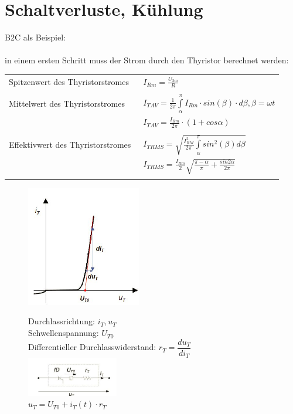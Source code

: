 	\section{Schaltverluste, Kühlung}
B2C als Beispiel:\\\\
in einem ersten Schritt muss der Strom durch den Thyristor berechnet werden:\\
\begin{tabular}{ll}
  Spitzenwert des Thyristorstromes&\ $I_{Rm} = \frac{U_{2m}}{R}$\\\\
  Mittelwert des Thyristorstromes &\ $I_{T AV} = \frac{1}{2\pi}\int\limits_{\alpha}^{\pi}I_{Rm} \cdot sin(\beta) \cdot d\beta, \beta = \omega t$\\
  &\ $I_{T AV} = \frac{I_{Rm}}{2\pi} \cdot (1+cos\alpha)$\\\\
  Effektivwert des Thyristorstromes &\ $I_{T RMS} = \sqrt{\frac{I_{RM}^2}{2\pi}\int\limits_{\alpha}^{\pi}sin^2(\beta)d\beta}$\\
  &\ $I_{T RMS} = \frac{I_{Rm}}{2}\sqrt{\frac{\pi - \alpha}{\pi}+\frac{sin2\alpha}{2\pi}}$\\\\
\end{tabular}

\begin{figure}[htbp]
  \begin{minipage}[t]{6cm}
    \vspace{0pt}
    \centering
    \includegraphics[width = 5cm]{./pictures/kennlinieThyristor} 
  \end{minipage}
  \hfill
  \begin{minipage}[t]{6cm}
    \vspace{0pt}
    Durchlassrichtung: $i_{T}, u_{T}$\\
    Schwellenspannung: $U_{T0}$\\
    Differentieller Durchlasswiderstand: $r_{T} = \dfrac{du_{T}}{di_{T}}$\\
    \includegraphics[width = 4cm]{./pictures/schemaThyristor}\\
    $u_{T} = U_{T0}+i_{T}(t) \cdot r_{T}$
  \end{minipage}
\end{figure}

